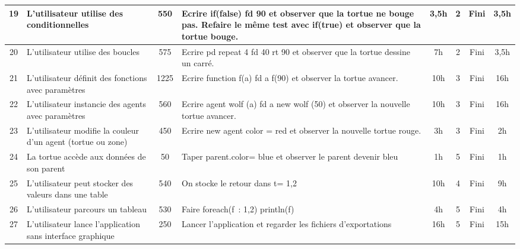 {\begin{longtable}[c]{|c|p{2cm}|c|p{4cm}|*{4}{c|}}
\hline
19 & L'utilisateur utilise des conditionnelles & 550 & Ecrire if(false) { fd 90 } et observer que la tortue ne bouge pas. Refaire le même test avec if(true) et observer que la tortue bouge. & 3,5h & 2 & Fini & 3,5h \\
\hline
20 & L'utilisateur utilise des boucles & 575 & Ecrire pd repeat 4 { fd 40 rt 90 } et observer que la tortue dessine un carré. & 7h & 2 & Fini & 3,5h \\
\hline
21 & L'utilisateur définit des fonctions avec paramètres & 1225 & Ecrire function f(a) { fd a } f(90) et observer la tortue avancer. & 10h & 3 & Fini & 16h \\
\hline
22 & L'utilisateur instancie des agents avec paramètres & 560 & Ecrire agent wolf (a) { fd a } new wolf (50) et observer la nouvelle tortue avancer. & 10h & 3 & Fini & 16h \\
\hline
23 & L'utilisateur modifie la couleur d'un agent (tortue ou zone) & 450 & Ecrire new agent { color = red } et observer la nouvelle tortue rouge. & 3h & 3 & Fini & 2h \\
\hline
24 & La tortue accède aux données de son parent & 50 & Taper parent.color= blue et observer le parent devenir bleu & 1h & 5 & Fini & 1h \\
\hline
25 & L'utilisateur peut stocker des valeurs dans une table & 540 & On stocke le retour dans t= {1,2} & 10h & 4 & Fini & 9h \\
\hline
26 & L'utilisateur parcours un tableau & 530 & Faire foreach(f~: {1,2}) println(f) & 4h & 5 & Fini & 4h \\
\hline
27 & L'utilisateur lance l'application sans interface graphique & 250 & Lancer l'application et regarder les fichiers d'exportations & 16h & 5 & Fini & 15h \\
\hline
\end{longtable}}
